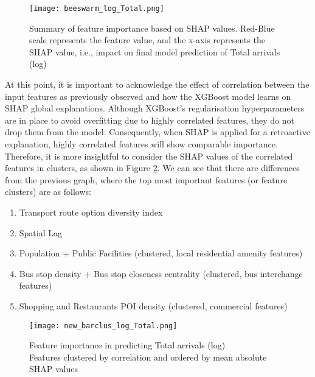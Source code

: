 \begin{figure}[!hbt]
    \centering
    \texttt{[image: beeswarm\_log\_Total.png]}
    \captionsetup{justification=centering}
    \caption{Summary of feature importance based on SHAP values. Red-Blue scale represents the feature value, and the x-axis represents the SHAP value, i.e., impact on final model prediction of Total arrivals (log)}
    \label{fig:beeswarmtotal}
\end{figure}

At this point, it is important to acknowledge the effect of correlation between the input features as previously observed and how the XGBoost model learns on SHAP global explanations. Although XGBoost's regularisation hyperparameters are in place to avoid overfitting due to highly correlated features, they do not drop them from the model. Consequently, when SHAP is applied for a retroactive explanation, highly correlated features will show comparable importance. Therefore, it is more insightful to consider the SHAP values of the correlated features in clusters, as shown in Figure \ref{fig:barclustertotal}. We can see that there are differences from the previous graph, where the top most important features (or feature clusters) are as follows:

\begin{enumerate}
    \setlength\itemsep{-0.3em}
    \item Transport route option diversity index
    \item Spatial Lag
    \item Population + Public Facilities (clustered, local residential amenity features)
    \item Bus stop density + Bus stop closeness centrality (clustered, bus interchange features)
    \item Shopping and Restaurants POI density (clustered, commercial features)
\end{enumerate}

\begin{figure}[ht]
    \centering
    \texttt{[image: new\_barclus\_log\_Total.png]}
    \captionsetup{justification=centering}
    \caption{Feature importance in predicting Total arrivals (log)\\ Features clustered by correlation and ordered by mean absolute SHAP values}
    \label{fig:barclustertotal}
\end{figure}

